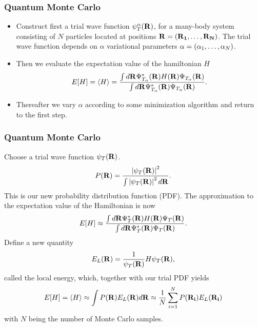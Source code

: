 \documentclass[compress]{beamer}
\begin{document}
\frame
{
  \frametitle{Quantum Monte Carlo}
\begin{small}
{\scriptsize
\begin{itemize}
\item Construct first a trial wave function $\psi_T^{\alpha}({\bf R})$, 
for a many-body
system consisting of $N$ particles located at positions
${\bf R=(R_1,\dots ,R_N)}$. The trial wave function depends
on $\alpha$ variational parameters 
${\bf \alpha}=(\alpha_1,\dots ,\alpha_N)$.
\item Then we evaluate the expectation value of the hamiltonian $H$ 
\[
   E[H]=\langle H \rangle =
   \frac{\int d{\bf R}\Psi^{\ast}_{T_{\alpha}}({\bf R})H({\bf R})
         \Psi_{T_{\alpha}}({\bf R})}
        {\int d{\bf R}\Psi^{\ast}_{T_{\alpha}}({\bf R})\Psi_{T_{\alpha}}({\bf R})}.
\]
\item Thereafter we vary $\alpha$ according to some minimization
algorithm and return to the first step.
\end{itemize}
}
\end{small}
}


\frame
{
  \frametitle{Quantum Monte Carlo}
\begin{small}
{\scriptsize
Choose a trial wave function
$\psi_T({\bf R})$.
\[
   P({\bf R})= \frac{\left|\psi_T({\bf R})\right|^2}{\int \left|\psi_T({\bf R})\right|^2d{\bf R}}.
\]
This is our new probability distribution function  (PDF).
The approximation to the expectation value of the Hamiltonian is now 
\[
   E[H]\approx 
   \frac{\int d{\bf R}\Psi^{\ast}_T({\bf R})H({\bf R})\Psi_T({\bf R})}
        {\int d{\bf R}\Psi^{\ast}_T({\bf R})\Psi_T({\bf R})}.
\]
Define a new quantity
\[
   E_L({\bf R})=\frac{1}{\psi_T({\bf R})}H\psi_T({\bf R}),
   \label{eq:locale1}
\]
called the local energy, which, together with our trial PDF yields
\[
  E[H]=\langle H \rangle \approx \int P({\bf R})E_L({\bf R}) d{\bf R}\approx \frac{1}{N}\sum_{i=1}^NP({\bf R_i})E_L({\bf R_i})
  \label{eq:vmc1}
\]
with $N$ being the number of Monte Carlo samples.
}
\end{small}
}
\end{document}

